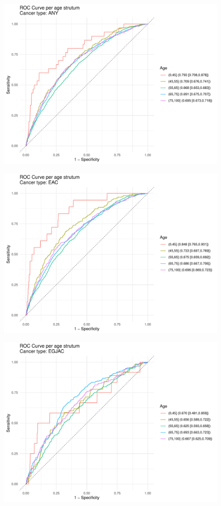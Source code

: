 \documentclass[english]{article}
\begin{document}
\begin{figure}[ht]
\includegraphics[width=1.0\linewidth]{identity/ANY_age.pdf}
\end{figure}
\begin{figure}[ht]
\includegraphics[width=1.0\linewidth]{identity/EAC_age.pdf}
\end{figure}
\begin{figure}[ht]
\includegraphics[width=1.0\linewidth]{identity/EGJAC_age.pdf}
\end{figure}
\end{document}
